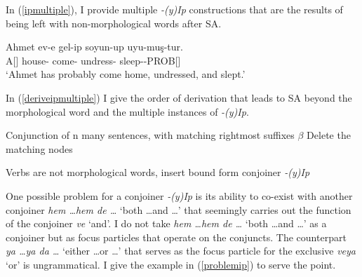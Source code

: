 In (\ref{ipmultiple}), I provide multiple \textit{-(y)Ip} constructions that are the results of being left with non-morphological words after SA.

\begin{exe}
\ex \label{ipmultiple}
\gll Ahmet ev-e gel-ip soyun-up uyu-muş-tur. \\
A[{\Nom}] house-{\Dat} come-{\Pc} undress-{\Pc} sleep-{\Prf}-PROB[{\Tsg}] \\
\glt `Ahmet has probably come home, undressed, and slept.'
\end{exe}

In (\ref{deriveipmultiple}) I give the order of derivation that leads to SA beyond the morphological word and the multiple instances of \textit{-(y)Ip}.

\begin{exe}
\ex \label{deriveipmultiple}
\begin{xlisti}
\ex Conjunction of n many sentences, with matching rightmost suffixes $\beta$
\ex Delete the matching nodes\\
\ex Verbs are not morphological words, insert bound form conjoiner \textit{-(y)Ip}\\
\end{xlisti}
\end{exe}


One possible problem for a conjoiner \textit{-(y)Ip} is its ability to co-exist with another conjoiner \textit{hem \ldots hem de \ldots} `both \ldots and \ldots' that seemingly carries out the function of the conjoiner \textit{ve} `and'. I do not take \textit{hem \ldots hem de \ldots} `both \ldots and \ldots' as a conjoiner but as focus particles that operate on the conjuncts. The counterpart \textit{ya \ldots ya da \ldots} `either \ldots or \ldots' that serves as the focus particle for the exclusive \textit{veya} `or' is ungrammatical. I give the example in (\ref{problemip}) to serve the point.

